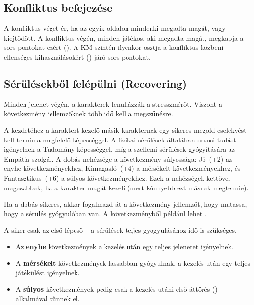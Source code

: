\subsection{Konfliktus befejezése}

A konfliktus véget ér, ha az egyik oldalon mindenki megadta magát, vagy kiejtődött. A konfliktus végén, minden játékos, aki megadta magát, megkapja a sors pontokat ezért (). A KM szintén ilyenkor osztja a konfliktus közbeni ellenséges kihasználásokért () járó sors pontokat.

\label{Sérülésekből felépülni}
\subsection[Sérülésekből felépülni]{Sérülésekből felépülni (Recovering)}

Minden jelenet végén, a karakterek lenullázzák a stresszmérőt. Viszont a következmény jellemzőknek több idő kell a megszűnésre.

A  kezdetéhez a karaktert kezelő másik karakternek egy sikeres megold cselekvést kell tennie a megfelelő képességgel. A fizikai sérülések általában orvosi tudást igényelnek a Tudomány képességgel, míg a szellemi sérülések gyógyítására az Empátia szolgál. A dobás nehézsége a következmény súlyossága: Jó~(+2) az enyhe következményekhez, Kimagasló~(+4) a mérsékelt következményekhez, és Fantasztikus~(+6) a súlyos következményekhez. Ezek a nehézségek kettővel magasabbak, ha a karakter magát kezeli (mert könnyebb ezt másnak megtennie).

Ha a dobás sikeres, akkor fogalmazd át a következmény jellemzőt, hogy mutassa, hogy a sérülés gyógyulóban van. A  következményből például lehet .

A siker csak az első lépcső -- a sérülések teljes gyógyulásához idő is szükséges.

\begin{itemize}
    \item Az \textbf{enyhe} következmények a kezelés után egy teljes jelenetet igényelnek.
    \item A \textbf{mérsékelt} következmények lassabban gyógyulnak, a kezelés után egy teljes játékülést igényelnek.
    \item A \textbf{súlyos} következmények pedig csak a kezelés utáni első áttörés () alkalmával tűnnek el.
\end{itemize}
